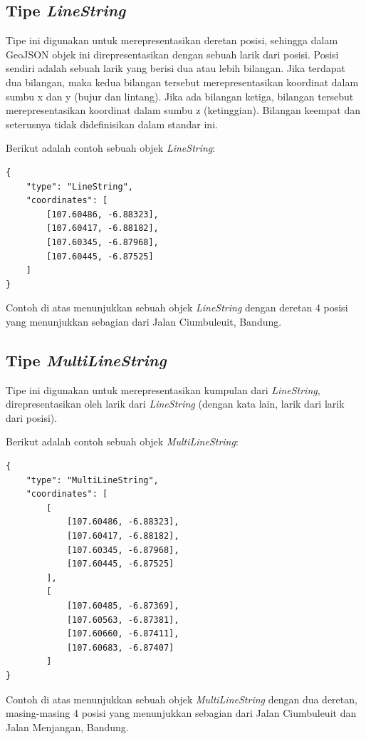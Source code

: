 \subsection{Tipe \textit{LineString}}

Tipe ini digunakan untuk merepresentasikan deretan posisi, sehingga dalam GeoJSON objek ini direpresentasikan dengan sebuah larik dari posisi. Posisi sendiri adalah sebuah larik yang berisi dua atau lebih bilangan. Jika terdapat dua bilangan, maka kedua bilangan tersebut merepresentasikan koordinat dalam sumbu x dan y (bujur dan lintang). Jika ada bilangan ketiga, bilangan tersebut merepresentasikan koordinat dalam sumbu z (ketinggian). Bilangan keempat dan seterusnya tidak didefinisikan dalam standar ini.

Berikut adalah contoh sebuah objek \textit{LineString}:

\begin{lstlisting}
{
	"type": "LineString",
	"coordinates": [
		[107.60486, -6.88323],
		[107.60417, -6.88182],
		[107.60345, -6.87968],
		[107.60445, -6.87525]
	]
}
\end{lstlisting}

Contoh di atas menunjukkan sebuah objek \textit{LineString} dengan deretan 4 posisi yang menunjukkan sebagian dari Jalan Ciumbuleuit, Bandung.

\subsection{Tipe \textit{MultiLineString}}

Tipe ini digunakan untuk merepresentasikan kumpulan dari \textit{LineString}, direpresentasikan oleh larik dari \textit{LineString} (dengan kata lain, larik dari larik dari posisi).

Berikut adalah contoh sebuah objek \textit{MultiLineString}:

\begin{lstlisting}
{
	"type": "MultiLineString",
	"coordinates": [
		[
			[107.60486, -6.88323],
			[107.60417, -6.88182],
			[107.60345, -6.87968],
			[107.60445, -6.87525]
		],
		[
			[107.60485, -6.87369],
			[107.60563, -6.87381],
			[107.60660, -6.87411],
			[107.60683, -6.87407]
		]
}
\end{lstlisting}

Contoh di atas menunjukkan sebuah objek \textit{MultiLineString} dengan dua deretan, masing-masing 4 posisi yang menunjukkan sebagian dari Jalan Ciumbuleuit dan Jalan Menjangan, Bandung.

